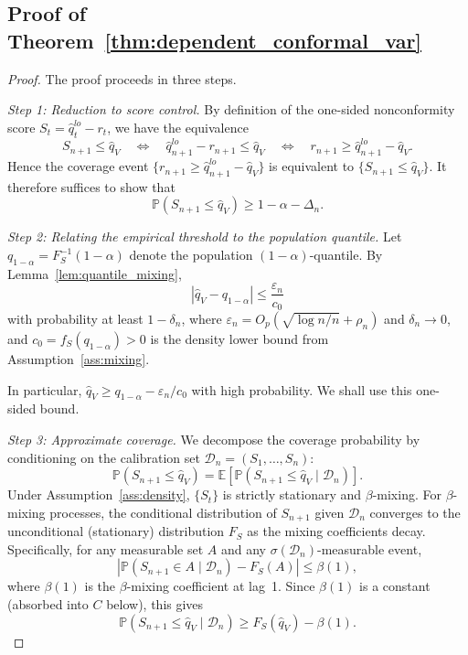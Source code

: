 \documentclass[preprint,11pt,authoryear]{elsarticle}
\newcommand{\1}{\boldsymbol{1}}
\begin{document}
	\subsection{Proof of Theorem~\ref{thm:dependent_conformal_var}}
	
	\begin{proof}
		The proof proceeds in three steps.
		
		\textit{Step 1: Reduction to score control.}\enspace
		By definition of the one-sided nonconformity score $S_t = \hat q_t^{lo}-r_t$, we have the equivalence
		\[
		S_{n+1}\le \hat q_V
		\quad \Longleftrightarrow \quad
		\hat q_{n+1}^{lo}-r_{n+1} \le \hat q_V
		\quad \Longleftrightarrow \quad
		r_{n+1} \ge \hat q^{lo}_{n+1}-\hat q_V.
		\]
		Hence the coverage event $\{r_{n+1} \ge \hat q_{n+1}^{lo}-\hat q_V\}$ is equivalent to $\{S_{n+1}\le \hat q_V\}$. It therefore suffices to show that
		\begin{equation}\label{eq:target}
			\mathbb P(S_{n+1}\le \hat q_V) \ge 1-\alpha - \Delta_n.
		\end{equation}
		
		\textit{Step 2: Relating the empirical threshold to the population quantile.}\enspace
		Let $q_{1-\alpha}=F_S^{-1}(1-\alpha)$ denote the population $(1-\alpha)$-quantile. By Lemma~\ref{lem:quantile_mixing},
		\begin{equation}\label{eq:qhat_bound}
			|\hat q_V - q_{1-\alpha}| \le \frac{\varepsilon_n}{c_0}
		\end{equation}
		with probability at least $1-\delta_n$, where $\varepsilon_n = O_p(\sqrt{\log n / n}+\rho_n)$ and $\delta_n\to 0$, and $c_0 = f_S(q_{1-\alpha})>0$ is the density lower bound from Assumption~\ref{ass:mixing}.
		
		In particular, $\hat q_V \ge q_{1-\alpha} - \varepsilon_n/c_0$ with high probability. We shall use this one-sided bound.
		
		\textit{Step 3: Approximate coverage.}\enspace
		We decompose the coverage probability by conditioning on the calibration set $\mathcal D_n = (S_1,\ldots,S_n)$:
		\[
		\mathbb P(S_{n+1}\le \hat q_V)
		= \mathbb E\!\left[\mathbb P(S_{n+1}\le \hat q_V \mid \mathcal D_n)\right].
		\]
		Under Assumption~\ref{ass:density}, $\{S_t\}$ is strictly stationary and $\beta$-mixing. For $\beta$-mixing processes, the conditional distribution of $S_{n+1}$ given $\mathcal D_n$ converges to the unconditional (stationary) distribution $F_S$ as the mixing coefficients decay. Specifically, for any measurable set $A$ and any $\sigma(\mathcal D_n)$-measurable event,
		\[
		|\mathbb P(S_{n+1}\in A \mid \mathcal D_n) - F_S(A)| \le \beta(1),
		\]
		where $\beta(1)$ is the $\beta$-mixing coefficient at lag~1. Since $\beta(1)$ is a constant (absorbed into $C$ below), this gives
		\begin{equation}\label{eq:conditional}
			\mathbb P(S_{n+1}\le \hat q_V \mid \mathcal D_n) \ge F_S(\hat q_V) - \beta(1).
		\end{equation}
		

\end{proof}
\end{document}
